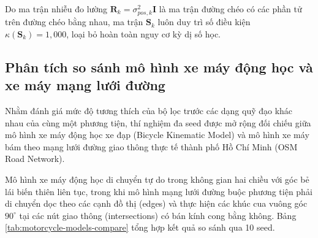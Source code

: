 Do ma trận nhiễu đo lường $\mathbf{R}_k = \sigma_{pos, k}^2 \mathbf{I}$ là ma trận đường chéo có các phần tử trên đường chéo bằng nhau, ma trận $\mathbf{S}_k$ luôn duy trì số điều kiện $\kappa(\mathbf{S}_k) = 1{,}000$, loại bỏ hoàn toàn nguy cơ kỳ dị số học.

\subsection{Phân tích so sánh mô hình xe máy động học và xe máy mạng lưới đường}

\hspace{0.5cm} Nhằm đánh giá mức độ tương thích của bộ lọc trước các dạng quỹ đạo khác nhau của cùng một phương tiện, thí nghiệm đa seed được mở rộng đối chiếu giữa mô hình xe máy động học xe đạp (Bicycle Kinematic Model) và mô hình xe máy bám theo mạng lưới đường giao thông thực tế thành phố Hồ Chí Minh (OSM Road Network).

Mô hình xe máy động học di chuyển tự do trong không gian hai chiều với góc bẻ lái biến thiên liên tục, trong khi mô hình mạng lưới đường buộc phương tiện phải di chuyển dọc theo các cạnh đồ thị (edges) và thực hiện các khúc cua vuông góc $90^\circ$ tại các nút giao thông (intersections) có bán kính cong bằng không. Bảng \ref{tab:motorcycle-models-compare} tổng hợp kết quả so sánh qua 10 seed.

